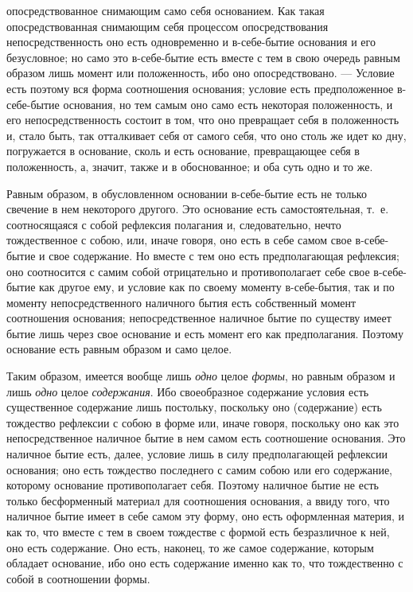 опосредствованное снимающим само себя основанием. Как такая
опосредствованная снимающим себя процессом опосредствования
непосредственность оно есть одновременно и в-себе-бытие основания и его
безусловное; но само это в-себе-бытие есть вместе с тем в свою очередь
равным образом лишь момент или положенность, ибо оно опосредствовано. —
Условие есть поэтому вся форма соотношения основания; условие есть
предположенное в-себе-бытие основания, но тем самым оно само есть некоторая
положенность, и его непосредственность состоит в том, что оно превращает
себя в положенность и, стало быть, так отталкивает себя от самого себя, что
оно столь же идет ко дну, погружается в основание, сколь и есть основание,
превращающее себя в положенность, а, значит, также и в обоснованное; и оба
суть одно и то же.

Равным образом, в обусловленном основании в-себе-бытие есть не только
свечение в нем некоторого другого. Это основание есть самостоятельная,
т.~е. соотносящаяся с собой рефлексия полагания и, следовательно, нечто
тождественное с собою, или, иначе говоря, оно есть в себе самом свое
в-себе-бытие и свое содержание. Но вместе с тем оно есть предполагающая
рефлексия; оно соотносится с самим собой отрицательно и противополагает
себе свое в-себе-бытие как другое ему, и условие как по своему моменту
в-себе-бытия, так и по моменту непосредственного наличного бытия есть
собственный момент соотношения основания; непосредственное наличное бытие
по существу имеет бытие лишь через свое основание и есть момент его как
предполагания. Поэтому основание есть равным образом и само целое.

Таким образом, имеется вообще лишь {\em одно} целое
{\em формы}, но равным образом и лишь
{\em одно} целое {\em содержания}.
Ибо своеобразное содержание условия есть существенное содержание лишь
постольку, поскольку оно (содержание) есть тождество рефлексии с собою в
форме или, иначе говоря, поскольку оно как это непосредственное наличное
бытие в нем самом есть соотношение основания. Это наличное бытие есть,
далее, условие лишь в силу предполагающей рефлексии основания; оно есть
тождество последнего с самим собою или его содержание, которому основание
противополагает себя. Поэтому наличное бытие не есть только бесформенный
материал для соотношения основания, а ввиду того, что наличное бытие имеет
в себе самом эту форму, оно есть оформленная материя, и как то, что вместе
с тем в своем тождестве с формой есть безразличное к ней, оно есть
содержание. Оно есть, наконец, то же самое содержание, которым обладает
основание, ибо оно есть содержание именно как то, что тождественно с собой
в соотношении формы.

